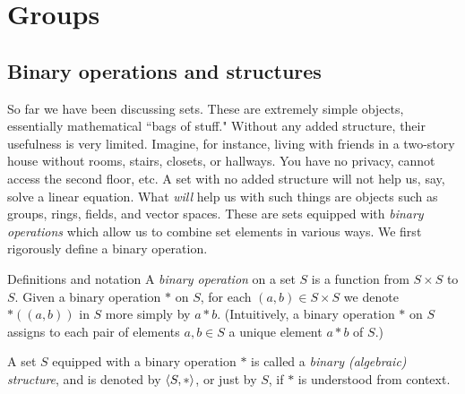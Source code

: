 \chapter{Groups}\label{gps} %

\section{Binary operations and structures}
So far we have been discussing sets. These are extremely simple
objects, essentially mathematical ``bags of stuff." Without any
added structure, their usefulness is very limited. Imagine, for
instance, living with friends in a two-story house without rooms,
stairs, closets, or hallways. You have no privacy, cannot access the
second floor, etc. A set with no added structure will not help us,
say, solve a linear equation.  What \textit{will} help us with such
things are objects such as groups, rings, fields, and vector spaces.
These are sets equipped with \textit{binary operations} which allow us
to combine set elements in various ways.  We first rigorously define
a binary operation.

\begin{df}{Definitions and notation} A \textit{binary operation} on a set $S$ is a function from
$S\times S$ to $S$. Given a binary operation $*$ on $S$, for
each $(a,b)\in S\times S$ we denote $*((a,b))$ in $S$ more
simply by $a*b$.  (Intuitively, a binary operation $*$ on $S$
assigns to each pair of elements $a,b \in S$ a unique element
$a*b$ of $S$.)

A set $S$ equipped with a binary operation $*$ is called a \textit{binary (algebraic) structure}, and is denoted by $\langle S,*\rangle$, or
just by $S$, if $*$ is understood from context.\end{df}

